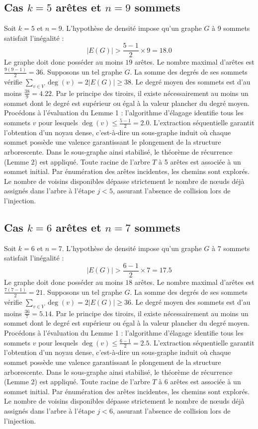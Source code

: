 \documentclass[12pt,a4paper]{article}
\begin{document}
\subsection{Cas $k = 5$ arêtes et $n = 9$ sommets}
Soit $k = 5$ et $n = 9$. L'hypothèse de densité impose qu'un graphe $G$ à 9 sommets satisfait l'inégalité :
$$ |E(G)| > \frac{5-1}{2} \times 9 = 18.0 $$
Le graphe doit donc posséder au moins $19$ arêtes. Le nombre maximal d'arêtes est $\frac{9(9-1)}{2} = 36$.
Supposons un tel graphe $G$. La somme des degrés de ses sommets vérifie $\sum_{v \in V} \deg(v) = 2|E(G)| \geq 38$.
Le degré moyen des sommets est d'au moins $\frac{38}{9} = 4.22$.
Par le principe des tiroirs, il existe nécessairement au moins un sommet dont le degré est supérieur ou égal à la valeur plancher du degré moyen.
Procédons à l'évaluation du Lemme 1 : l'algorithme d'élagage identifie tous les sommets $v$ pour lesquels $\deg(v) \leq \frac{5-1}{2} = 2.0$.
L'extraction séquentielle garantit l'obtention d'un noyau dense, c'est-à-dire un sous-graphe induit où chaque sommet possède une valence garantissant le plongement de la structure arborescente.
Dans le sous-graphe ainsi stabilisé, le théorème de récurrence (Lemme 2) est appliqué. Toute racine de l'arbre $T$ à 5 arêtes est associée à un sommet initial. Par énumération des arêtes incidentes, les chemins sont explorés. Le nombre de voisins disponibles dépasse strictement le nombre de nœuds déjà assignés dans l'arbre à l'étape $j < 5$, assurant l'absence de collision lors de l'injection.

\subsection{Cas $k = 6$ arêtes et $n = 7$ sommets}
Soit $k = 6$ et $n = 7$. L'hypothèse de densité impose qu'un graphe $G$ à 7 sommets satisfait l'inégalité :
$$ |E(G)| > \frac{6-1}{2} \times 7 = 17.5 $$
Le graphe doit donc posséder au moins $18$ arêtes. Le nombre maximal d'arêtes est $\frac{7(7-1)}{2} = 21$.
Supposons un tel graphe $G$. La somme des degrés de ses sommets vérifie $\sum_{v \in V} \deg(v) = 2|E(G)| \geq 36$.
Le degré moyen des sommets est d'au moins $\frac{36}{7} = 5.14$.
Par le principe des tiroirs, il existe nécessairement au moins un sommet dont le degré est supérieur ou égal à la valeur plancher du degré moyen.
Procédons à l'évaluation du Lemme 1 : l'algorithme d'élagage identifie tous les sommets $v$ pour lesquels $\deg(v) \leq \frac{6-1}{2} = 2.5$.
L'extraction séquentielle garantit l'obtention d'un noyau dense, c'est-à-dire un sous-graphe induit où chaque sommet possède une valence garantissant le plongement de la structure arborescente.
Dans le sous-graphe ainsi stabilisé, le théorème de récurrence (Lemme 2) est appliqué. Toute racine de l'arbre $T$ à 6 arêtes est associée à un sommet initial. Par énumération des arêtes incidentes, les chemins sont explorés. Le nombre de voisins disponibles dépasse strictement le nombre de nœuds déjà assignés dans l'arbre à l'étape $j < 6$, assurant l'absence de collision lors de l'injection.
\end{document}
